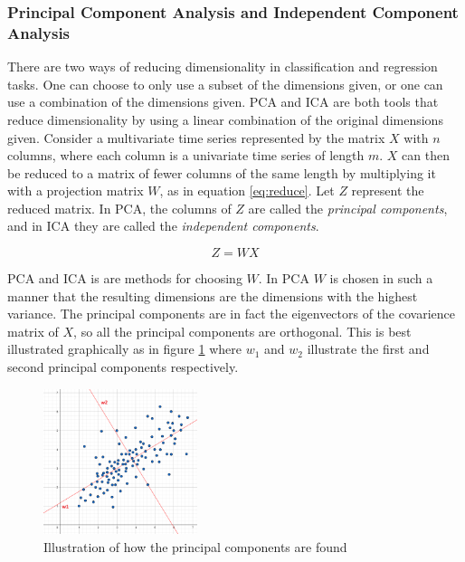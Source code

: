\subsubsection*{Principal Component Analysis and Independent Component Analysis}
There are two ways of reducing dimensionality in classification and regression tasks. 
One can choose to only use a subset of the dimensions given, or one can use a combination of the dimensions given.
PCA and ICA are both tools that reduce dimensionality by using a linear combination of the original dimensions given.
Consider a multivariate time series represented by the matrix $X$ with $n$ columns, where each column is a univariate time series of length $m$.
$X$ can then be reduced to a matrix of fewer columns of the same length by multiplying it with a projection matrix $W$, as in equation \ref{eq:reduce}. 
Let $Z$ represent the reduced matrix.
In PCA, the columns of $Z$ are called the \textit{principal components}, and in ICA they are called the \textit{independent components}. 

\begin{equation}
    Z = W X
    \label{eq:reduce}
\end{equation}

PCA and ICA is are methods for choosing $W$. 
In PCA $W$ is chosen in such a manner that the resulting dimensions are the dimensions with the highest variance.
The principal components are in fact the eigenvectors of the covarience matrix of $X$, so all the principal components are orthogonal. 
This is best illustrated graphically as in figure \ref{fig:pca_illustrated} where $w_1$ and $w_2$ illustrate the first and second principal components respectively.

\begin{figure}
    \begin{center}
    \includegraphics[width=0.4\textwidth]{tsc/pca_illustrated.png}
    \end{center}
    \caption{Illustration of how the principal components are found} 
    \label{fig:pca_illustrated}
\end{figure}

